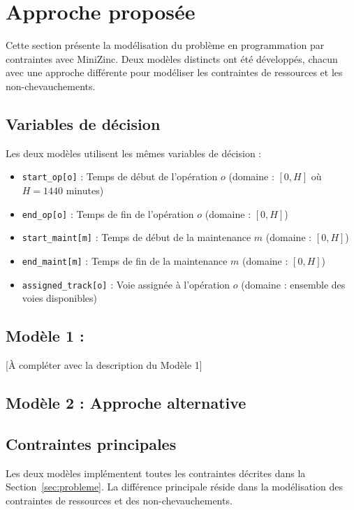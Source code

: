 \section{Approche proposée}
\label{sec:approche}

Cette section présente la modélisation du problème en programmation par contraintes avec MiniZinc. Deux modèles distincts ont été développés, chacun avec une approche différente pour modéliser les contraintes de ressources et les non-chevauchements.

\subsection{Variables de décision}

Les deux modèles utilisent les mêmes variables de décision :
\begin{itemize}
    \item \texttt{start\_op[o]} : Temps de début de l'opération $o$ (domaine : $[0, H]$ où $H = 1440$ minutes)
    \item \texttt{end\_op[o]} : Temps de fin de l'opération $o$ (domaine : $[0, H]$)
    \item \texttt{start\_maint[m]} : Temps de début de la maintenance $m$ (domaine : $[0, H]$)
    \item \texttt{end\_maint[m]} : Temps de fin de la maintenance $m$ (domaine : $[0, H]$)
    \item \texttt{assigned\_track[o]} : Voie assignée à l'opération $o$ (domaine : ensemble des voies disponibles)
\end{itemize}

\subsection{Modèle 1 :}

[À compléter avec la description du Modèle 1]

\subsection{Modèle 2 : Approche alternative}

\subsection{Contraintes principales}

Les deux modèles implémentent toutes les contraintes décrites dans la Section~\ref{sec:probleme}. La différence principale réside dans la modélisation des contraintes de ressources et des non-chevauchements.

